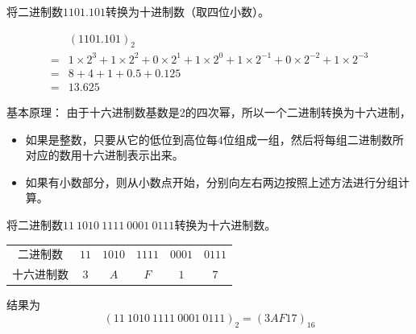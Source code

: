 \begin{frame}
\begin{li}
将二进制数$1101.101$转换为十进制数（取四位小数）。
\end{li}
\pause 
$$
\begin{array}{rl}
& (1101.101)_2 \\[0.1in]
= & 1\times2^3+1\times2^2+0\times2^1+1\times2^0
+1\times2^{-1}+0\times2^{-2}+1\times2^{-3}\\[0.1in]
= & 8+4+1+0.5+0.125\\[0.1in]
= & 13.625
\end{array}
$$
\end{frame}
%
\begin{frame}

{基本原理：} 由于十六进制数基数是2的四次幂，所以一个二进制转换为十六进制，
\begin{itemize}
\item
如果是整数，只要从它的低位到高位每$4$位组成一组，然后将每组二进制数所对应的数用十六进制表示出来。\\[0.1in]
\item
如果有小数部分，则从小数点开始，分别向左右两边按照上述方法进行分组计算。
\end{itemize}
\end{frame}
%
\begin{frame}
\begin{li}
将二进制数$11~1010~1111~0001~0111$转换为十六进制数。
\end{li}
\pause 
\begin{table}
\centering
\begin{tabular}{cccccc}\hline
二进制数&$11$&$1010$&$1111$&$0001$&$0111$\\[0.1in]
十六进制数&$3$&$A$&$F$&$1$&$7$\\ \hline
\end{tabular}
\end{table}
结果为
$$
(11~1010~1111~0001~0111)_2=(3AF17)_{16}
$$
\end{frame}
%
%
